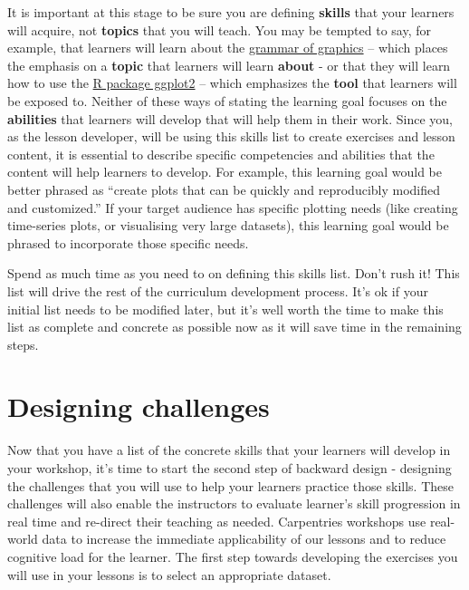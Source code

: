 \documentclass[]{book}
\begin{document}
It is important at this stage to be sure you are defining \textbf{skills} that your
learners will acquire, not \textbf{topics} that you will teach. You may be tempted to
say, for example, that learners will learn about the \href{https://vita.had.co.nz/papers/layered-grammar.html}{grammar of
graphics} -- which places the
emphasis on a \textbf{topic} that learners will learn \textbf{about} - or that they will
learn how to use the \href{https://ggplot2.tidyverse.org/}{R package ggplot2} -- which
emphasizes the \textbf{tool} that learners will be exposed to. Neither of these ways
of stating the learning goal focuses on the \textbf{abilities} that learners will
develop that will help them in their work. Since you, as the lesson developer,
will be using this skills list to create exercises and lesson content, it is
essential to describe specific competencies and abilities that the content will
help learners to develop. For example, this learning goal would be better
phrased as ``create plots that can be quickly and reproducibly modified and
customized.'' If your target audience has specific plotting needs (like creating
time-series plots, or visualising very large datasets), this learning goal would
be phrased to incorporate those specific needs.

Spend as much time as you need to on defining this skills list. Don't rush it!
This list will drive the rest of the curriculum development process. It's ok if
your initial list needs to be modified later, but it's well worth the time to
make this list as complete and concrete as possible now as it will save time in
the remaining steps.

\hypertarget{designing-challenges}{%
\chapter{Designing challenges}\label{designing-challenges}}

Now that you have a list of the concrete skills that your learners will develop in your
workshop, it's time to start the second step of backward design - designing the
challenges that you will use to help your learners practice those skills. These challenges
will also enable the instructors to evaluate learner's skill progression in real time
and re-direct their teaching as needed. Carpentries workshops use real-world
data to increase the immediate applicability of our lessons and to reduce cognitive load
for the learner. The first step towards developing the exercises you will use in your
lessons is to select an appropriate dataset.
\end{document}
